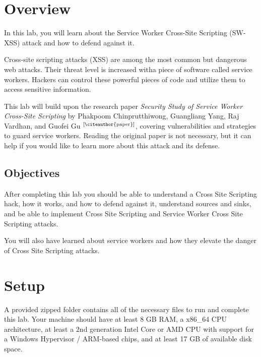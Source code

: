 \documentclass[letterpaper,12pt]{report}
\begin{document}
\clearpage
{}
\settableofcontents
\tableofcontents
\clearpage


\section*{Overview}\label{sec:work-carried-out}

In this lab, you will learn about the Service Worker Cross-Site Scripting (SW-XSS) attack and how to defend against it.

Cross-site scripting attacks (XSS) are among the most common but dangerous web attacks. Their threat level is increased witha piece of software called service workers. Hackers can control these powerful pieces of code and utilize them to access sensitive information.

This lab will build upon the research paper \emph{Security Study of Service Worker Cross-Site Scripting} by Phakpoom Chinprutthiwong, Guangliang Yang, Raj Vardhan, and Guofei Gu $^{\text{[\citeauthor{paper}]}}$, covering vulnerabilities and strategies to guard service workers. Reading the original paper is not necessary, but it can help if you would like to learn more about this attack and its defense.

\subsection*{Objectives}

After completing this lab you should be able to understand a Cross Site Scripting hack, how it works, and how to defend against it, understand sources and sinks, and be able to implement Cross Site Scripting and Service Worker Cross Site Scripting attacks. 

You will also have learned about service workers and how they elevate the danger of Cross Site Scripting attacks.


\section*{Setup}\label{sec:Setup}

A provided zipped folder contains all of the necessary files to run and complete this lab. Your machine should have at least 8 GB RAM, a x86\_64 CPU architecture, at least a 2nd generation Intel Core or AMD CPU with support for a Windows Hypervisor / ARM-based chips, and at least 17 GB of available disk space.
\end{document}
